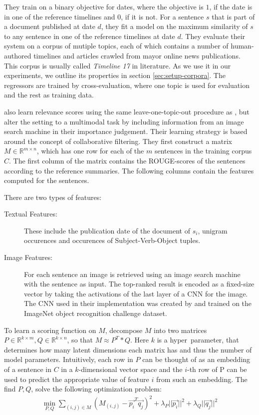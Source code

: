 \documentclass[a4paper,BCOR=10mm]{report}
\numberwithin{lemma}{chapter}
\numberwithin{definition}{chapter}
\begin{document}
They train on a binary objective for dates, where the objective is $1$, if the date is in one of the reference timelines and $0$, if it is not.
For a sentence $s$ that is part of a document published at date $d$, they fit a model on the maximum similarity of $s$ to any sentence in one of the reference timelines at date $d$.
They evaluate their system on a corpus of mutiple topics, each of which contains a number of human-authored timelines and articles crawled from mayor online news publications. This corpus is usually called \textit{Timeline 17} in literature. As we use it in our experiments, we outline its properties in section \ref{sec:setup-corpora}. The regressors are trained by cross-evaluation, where one topic is used for evaluation and the rest as training data.

\citet{multimodal} also learn relevance scores using the same leave-one-topic-out procedure as \citet{tran-headlines}, but alter the setting to a multimodal task by including information from an image search machine in their importance judgement.
Their learning strategy is based around the concept of collaborative filtering.
They first construct a matrix $M \in \mathbb{R}^{m \times n}$, which has one row for each of the $m$ sentences in the training corpus $C$. The first column of the matrix contains the ROUGE-scores of the sentences according to the reference summaries. The following columns contain the features computed for the sentences.

There are two types of features:

\begin{description}
\item[Textual Features:]{These include the publication date of the document of $s_i$, unigram occurences and occurences of Subject-Verb-Object tuples.}
\item[Image Features:]{For each sentence an image is retrieved using an image search machine with the sentence as input. The top-ranked result is encoded as a fixed-size vector by taking the activations of the last layer of a CNN for the image. The CNN used in their implementation was created by \citet{Simonyan+Zisserman} and trained on the ImageNet \citep{ImageNet} object recognition challenge dataset.}
\end{description}

To learn a scoring function on $M$, \citet{multimodal} decompose $M$ into two matrices $P \in \mathbb{R}^{k \times m}, Q \in \mathbb{R}^{k \times n}$, so that $M \approx P^T * Q$. Here $k$ is a hyper~parameter, that determines how many latent dimensions each matrix has and thus the number of model parameters. Intuitively, each row in $P$ can be thought of as an embedding of a sentence in $C$ in a $k$-dimensional vector space and the $i$-th row of P can be used to predict the appropriate value of feature $i$ from such an embedding.
The find $P, Q$, \citeauthor{multimodal} solve the following optimization problem:
\begin{align}
\min_{P, Q} \sum_{(i,j) \in M} (M_{(i,j)} - \vec{p_i}^T\vec{q_j})^2 + \lambda_P ||\vec{p_i}|| ^ 2 + \lambda_Q ||\vec{q_j}|| ^ 2 \label{multimodal-objective}
\end{align}
\end{document}
